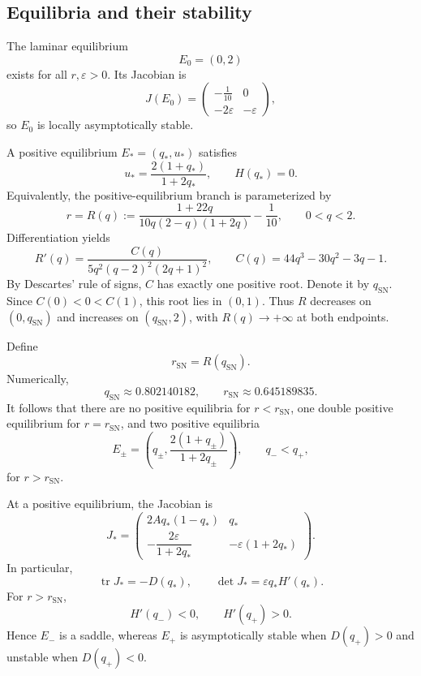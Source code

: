 \documentclass[11pt,reqno]{amsart}
\theoremstyle{plain}
\theoremstyle{definition}
\theoremstyle{remark}
\begin{document}
\subsection{Equilibria and their stability}
\label{subsec:equilibria}

The laminar equilibrium
\[
E_0=(0,2)
\]
exists for all $r,\varepsilon>0$. Its Jacobian is
\[
J(E_0)=
\begin{pmatrix}
-\frac{1}{10}&0\\
-2\varepsilon&-\varepsilon
\end{pmatrix},
\]
so $E_0$ is locally asymptotically stable.

A positive equilibrium $E_*=(q_*,u_*)$ satisfies
\begin{equation}
u_*=\frac{2(1+q_*)}{1+2q_*},
\qquad H(q_*)=0.
\label{eq:positive-equilibrium}
\end{equation}
Equivalently, the positive-equilibrium branch is parameterized by
\begin{equation}
r=R(q):=
\frac{1+22q}{10q(2-q)(1+2q)}-\frac{1}{10},
\qquad 0<q<2.
\label{eq:equilibrium-curve}
\end{equation}
Differentiation yields
\begin{equation}
R'(q)=
\frac{C(q)}
{5q^2(q-2)^2(2q+1)^2},
\qquad
C(q)=44q^3-30q^2-3q-1.
\label{eq:R-derivative}
\end{equation}
By Descartes' rule of signs, $C$ has exactly one positive
root. Denote it by $q_{\mathrm{SN}}$. Since
$C(0)<0<C(1)$, this root lies in $(0,1)$.
Thus $R$ decreases on $(0,q_{\mathrm{SN}})$ and increases
on $(q_{\mathrm{SN}},2)$, with
$R(q)\to+\infty$ at both endpoints.

Define
\begin{equation}
r_{\mathrm{SN}}=R(q_{\mathrm{SN}}).
\label{eq:rSN}
\end{equation}
Numerically,
\[
q_{\mathrm{SN}}\approx0.802140182,
\qquad
r_{\mathrm{SN}}\approx0.645189835.
\]
It follows that there are no positive equilibria for
$r<r_{\mathrm{SN}}$, one double positive equilibrium for
$r=r_{\mathrm{SN}}$, and two positive equilibria
\[
E_\pm=
\left(q_\pm,\frac{2(1+q_\pm)}{1+2q_\pm}\right),
\qquad q_-<q_+,
\]
for $r>r_{\mathrm{SN}}$.

At a positive equilibrium, the Jacobian is
\begin{equation}
J_*=
\begin{pmatrix}
2Aq_*(1-q_*)&q_*\\[1mm]
-\dfrac{2\varepsilon}{1+2q_*}&-\varepsilon(1+2q_*)
\end{pmatrix}.
\label{eq:positive-jacobian}
\end{equation}
In particular,
\begin{equation}
\operatorname{tr}J_*=-D(q_*),
\qquad
\det J_*=\varepsilon q_*H'(q_*).
\label{eq:trace-determinant}
\end{equation}
For $r>r_{\mathrm{SN}}$,
\[
H'(q_-)<0,
\qquad H'(q_+)>0.
\]
Hence $E_-$ is a saddle, whereas $E_+$ is asymptotically
stable when $D(q_+)>0$ and unstable when $D(q_+)<0$.
\end{document}
